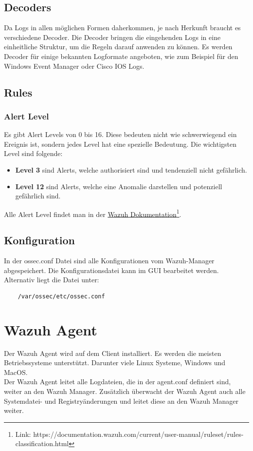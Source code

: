 \subsection{Decoders}
Da Logs in allen möglichen Formen daherkommen, je nach Herkunft braucht es verschiedene Decoder.
Die Decoder bringen die eingehenden Logs in eine einheitliche Struktur, um die Regeln darauf anwenden zu können.
Es werden Decoder für einige bekannten Logformate angeboten, wie zum Beispiel für den Windows Event Manager oder Cisco IOS Logs.\\



\subsection{Rules}


\subsubsection{Alert Level}
Es gibt Alert Levels von 0 bis 16. 
Diese bedeuten nicht wie schwerwiegend ein Ereignis ist, sondern jedes Level hat eine spezielle Bedeutung.
Die wichtigsten Level sind folgende:
\begin{itemize}
    \item \textbf{Level 3} sind Alerts, welche authorisiert sind und tendenziell nicht gefährlich.
    \item \textbf{Level 12} sind Alerts, welche eine Anomalie darstellen und potenziell gefährlich sind.
\end{itemize}

Alle Alert Level findet man in der \href{https://documentation.wazuh.com/current/user-manual/ruleset/rules-classification.html}{Wazuh Dokumentation}\footnote{Link: https://documentation.wazuh.com/current/user-manual/ruleset/rules-classification.html}.


\subsection{Konfiguration}
In der ossec.conf Datei sind alle Konfigurationen vom Wazuh-Manager abgespeichert.
Die Konfigurationsdatei kann im GUI bearbeitet werden. Alternativ liegt die Datei unter:
\begin{lstlisting}
    /var/ossec/etc/ossec.conf
\end{lstlisting}


\section{Wazuh Agent}
Der Wazuh Agent wird auf dem Client installiert.
Es werden die meisten Betriebssysteme unterstützt. Darunter viele Linux Systeme, Windows und MacOS.\\

Der Wazuh Agent leitet alle Logdateien, die in der agent.conf definiert sind, weiter an den Wazuh Manager.
Zusätzlich überwacht der Wazuh Agent auch alle Systemdatei- und Registryänderungen und leitet diese an den Wazuh Manager weiter. 
